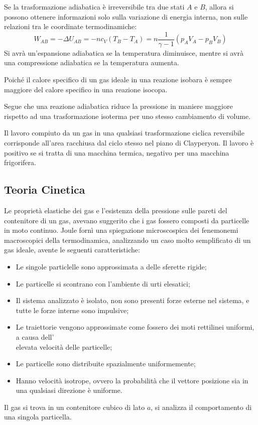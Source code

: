 \documentclass{article}
\numberwithin{equation}{subsection}
\begin{document}
Se la trasformazione adiabatica è irreversibile tra due stati $A$ e $B$, allora si possono ottenere informazioni solo sulla variazione di energia interna, non sulle 
relazioni tra le coordinate termodinamiche:
\begin{equation*}
    W_{AB}=-\Delta U_{AB}=-nc_V(T_B-T_A)=\displaystyle n\frac{1}{\gamma-1}(p_AV_A-p_BV_B)
\end{equation*}
Si avrà un'espansione adiabatica se la temperatura diminuisce, mentre si avrà una compressione adiabatica se la temperatura aumenta. 


Poiché il calore 
specifico di un gas ideale in una reazione isobara è sempre 
maggiore del calore specifico in una reazione isocopa. 


Segue che 
una reazione adiabatica riduce la pressione in maniere maggiore 
rispetto ad una trasformazione isoterma per uno stesso 
cambiamento di volume.


Il lavoro compiuto da un gas in una qualsiasi trasformazione ciclica reversibile corrisponde all'area racchiusa dal ciclo stesso nel piano di Clayperyon. Il lavoro è positivo 
se si tratta di una macchina termica, negativo per una macchina frigorifera. 

\subsection{Teoria Cinetica}


Le proprietà elastiche dei gas e l'esistenza della pressione sulle pareti del contenitore di un gas, avevano suggerito che i gas fossero composti da particelle in moto 
continuo. Joule fornì una spiegazione microscospica 
dei fenemonemi macroscopici della termodinamica, analizzando 
un caso molto semplificato di un gas ideale, avente le seguenti 
caratteristiche:
\begin{itemize}
    \item Le singole particlelle sono approssimata a delle sferette rigide;
    \item Le particelle si scontrano con l'ambiente di urti elesatici;
    \item Il sistema analizzato è isolato, non sono presenti forze 
    esterne nel sistema, e tutte le forze interne sono impulsive;
    \item Le traiettorie vengono approssimate come fossero dei 
    moti rettilinei uniformi, a causa dell'\\elevata velocità 
    delle particelle;
    \item Le particelle sono distribuite spazialmente uniformemente;
    \item Hanno velocità isotrope, ovvero la probabilità che 
    il vettore posizione sia in una qualsiasi direzione è uniforme. 
\end{itemize}
Il gas si trova in un contenitore cubico di lato $a$, 
si analizza il comportamento di una singola particella.
\end{document}
